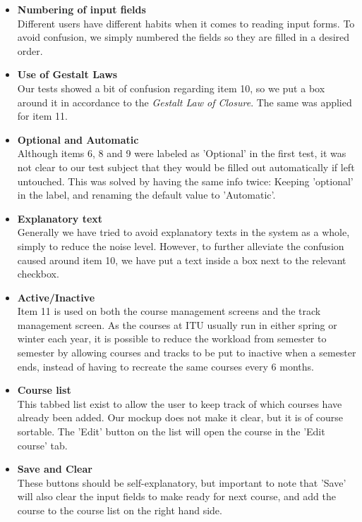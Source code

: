 \begin{itemize}
\item \textbf{Numbering of input fields} \\
Different users have different habits when it comes to reading input forms. To avoid confusion, we simply numbered the fields so they are filled in a desired order.
\item \textbf{Use of Gestalt Laws} \\
Our tests showed a bit of confusion regarding item 10, so we put a box around it in accordance to the \emph{Gestalt Law of Closure}. The same was applied for item 11.
\item \textbf{Optional and Automatic} \\
Although items 6, 8 and 9 were labeled as 'Optional' in the first test, it was not clear to our test subject that they would be filled out automatically if left untouched. This was solved by having the same info twice: Keeping 'optional' in the label, and renaming the default value to 'Automatic'.
\item \textbf{Explanatory text} \\
Generally we have tried to avoid explanatory texts in the system as a whole, simply to reduce the noise level\cite{steve}. However, to further alleviate the confusion caused around item 10, we have put a text inside a box next to the relevant checkbox.
\item \textbf{Active/Inactive} \\
Item 11 is used on both the course management screens and the track management screen. As the courses at ITU usually run in either spring or winter each year, it is possible to reduce the workload from semester to semester by allowing courses and tracks to be put to inactive when a semester ends, instead of having to recreate the same courses every 6 months.
\item \textbf{Course list} \\
This tabbed list exist to allow the user to keep track of which courses have already been added. Our mockup does not make it clear, but it is of course sortable. The 'Edit' button on the list will open the course in the 'Edit course' tab.
\item \textbf{Save and Clear} \\
These buttons should be self-explanatory, but important to note that 'Save' will also clear the input fields to make ready for next course, and add the course to the course list on the right hand side.
\end{itemize}

